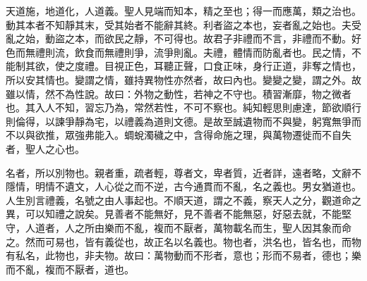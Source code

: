 
天道施，地道化，人道義。聖人見端而知本，精之至也；得一而應萬，類之治也。動其本者不知靜其末，受其始者不能辭其終。利者盜之本也，妄者亂之始也。夫受亂之始，動盜之本，而欲民之靜，不可得也。故君子非禮而不言，非禮而不動。好色而無禮則流，飲食而無禮則爭，流爭則亂。夫禮，體情而防亂者也。民之情，不能制其欲，使之度禮。目視正色，耳聽正聲，口食正味，身行正道，非奪之情也，所以安其情也。變謂之情，雖持異物性亦然者，故曰內也。變變之變，謂之外。故雖以情，然不為性說。故曰：外物之動性，若神之不守也。積習漸靡，物之微者也。其入人不知，習忘乃為，常然若性，不可不察也。純知輕思則慮達，節欲順行則倫得，以諫爭靜為宅，以禮義為道則文德。是故至誠遺物而不與變，躬寬無爭而不以與欲推，眾強弗能入。蜩蛻濁穢之中，含得命施之理，與萬物遷徙而不自失者，聖人之心也。

名者，所以別物也。親者重，疏者輕，尊者文，卑者質，近者詳，遠者略，文辭不隱情，明情不遺文，人心從之而不逆，古今通貫而不亂，名之義也。男女猶道也。人生別言禮義，名號之由人事起也。不順天道，謂之不義，察天人之分，觀道命之異，可以知禮之說矣。見善者不能無好，見不善者不能無惡，好惡去就，不能堅守，人道者，人之所由樂而不亂，複而不厭者，萬物載名而生，聖人因其象而命之。然而可易也，皆有義從也，故正名以名義也。物也者，洪名也，皆名也，而物有私名，此物也，非夫物。故曰：萬物動而不形者，意也；形而不易者，德也；樂而不亂，複而不厭者，道也。





